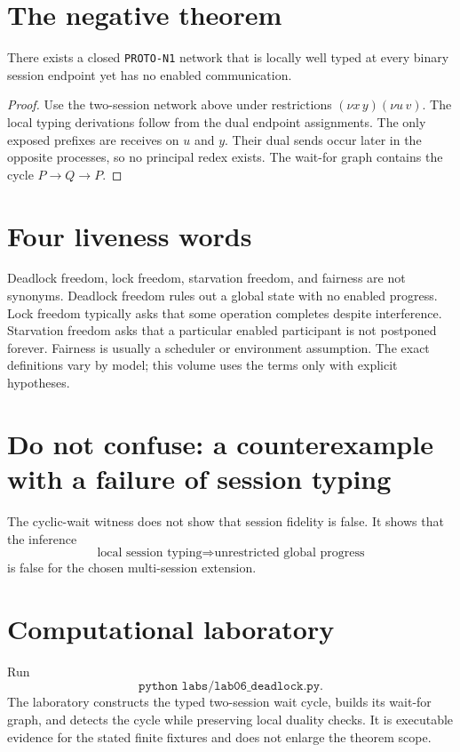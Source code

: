 

\section{The negative theorem}
\begin{proposition}
There exists a closed \texttt{PROTO-N1} network that is locally well typed at every binary session endpoint yet has no enabled communication.
\end{proposition}
\begin{proof}
Use the two-session network above under restrictions $(\nu x\,y)(\nu u\,v)$. The local typing derivations follow from the dual endpoint assignments. The only exposed prefixes are receives on $u$ and $y$. Their dual sends occur later in the opposite processes, so no principal redex exists. The wait-for graph contains the cycle $P\to Q\to P$.
\end{proof}

\section{Four liveness words}
Deadlock freedom, lock freedom, starvation freedom, and fairness are not synonyms. Deadlock freedom rules out a global state with no enabled progress. Lock freedom typically asks that some operation completes despite interference. Starvation freedom asks that a particular enabled participant is not postponed forever. Fairness is usually a scheduler or environment assumption. The exact definitions vary by model; this volume uses the terms only with explicit hypotheses.

\section{Do not confuse: a counterexample with a failure of session typing}
\begin{warningbox}
The cyclic-wait witness does not show that session fidelity is false. It shows that the inference
\[
\text{local session typing}\Longrightarrow\text{unrestricted global progress}
\]
is false for the chosen multi-session extension.
\end{warningbox}



\section{Computational laboratory}
\begin{labbox}
Run
\[
  \texttt{python labs/lab06_deadlock.py}.
\]
The laboratory constructs the typed two-session wait cycle, builds its wait-for graph, and detects the cycle while preserving local duality checks. It is executable evidence for the stated finite fixtures and does not enlarge the theorem scope.
\end{labbox}

